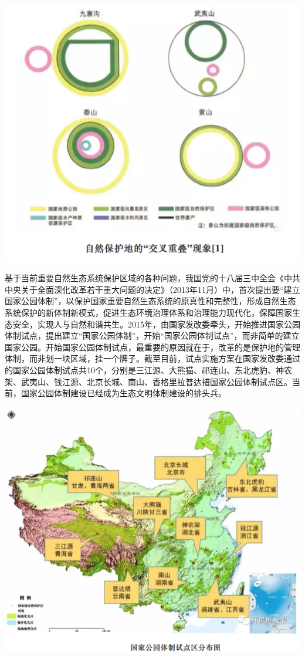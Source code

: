 \documentclass[
]{book}
\begin{document}
\includegraphics[width=8.33in]{images/park3}

基于当前重要自然生态系统保护区域的各种问题，我国党的十八届三中全会《中共中央关于全面深化改革若干重大问题的决定》（2013年11月）中，首次提出要``建立国家公园体制''，以保护国家重要自然生态系统的原真性和完整性，形成自然生态系统保护的新体制新模式，促进生态环境治理体系和治理能力现代化，保障国家生态安全，实现人与自然和谐共生。2015年，由国家发改委牵头，开始推进国家公园体制试点，提出建立``国家公园体制''，开始``国家公园体制试点''，而非简单的建立国家公园。开始国家公园体制试点，最重要的原因就在于，改革的是保护地的管理体制，而非划一块区域，挂一个牌子。截至目前，试点实施方案在国家发改委通过的国家公园体制试点共10个，分别是三江源、大熊猫、祁连山、东北虎豹、神农架、武夷山、钱江源、北京长城、南山、香格里拉普达措国家公园体制试点区。当前，国家公园体制建设已经成为生态文明体制建设的排头兵。

\includegraphics[width=8.33in]{images/park4}
\end{document}
